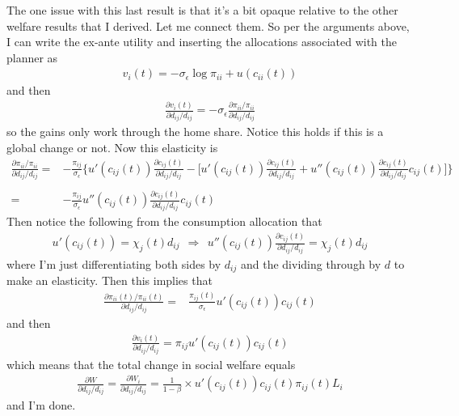 \documentclass[12pt,pdftex]{article}
\begin{document}
\begin{onehalfspacing}
The one issue with this last result is that it's a bit opaque relative to the other welfare results that I derived. Let me connect them. So per the arguments above, I can write the ex-ante utility  and inserting the allocations associated with the planner as
\begin{align}
v_i(t) = -\sigma_{\epsilon} \log \pi_{ii} + u(c_{ii}(t))
\end{align}
and then
\begin{align}
\frac{\partial v_i(t)}{\partial d_{ij} / d_{ij}} = -\sigma_{\epsilon} \frac{\partial \pi_{ii} / \pi_{ii}}{\partial d_{ij} / d_{ij}}
\end{align}
so the gains only work through the home share. Notice this holds if this is a global change or not. Now this elasticity is
\begin{align}
\frac{\partial \pi_{ii} / \pi_{ii}}{\partial d_{ij} / d_{ij}} =& -\frac{\pi_{ij}}{\sigma_{\epsilon}} \bigg \{ u'(c_{ij}(t))\frac{\partial c_{ij}(t)}{\partial d_{ij} / d_{ij}} - \bigg [u'(c_{ij}(t))\frac{\partial c_{ij}(t)}{\partial d_{ij} / d_{ij}} + u''(c_{ij}(t))\frac{\partial c_{ij}(t)}{\partial d_{ij} / d_{ij}}c_{ij}(t) \bigg ] \bigg \} \\
\nonumber \\
=& -\frac{\pi_{ij}}{\sigma_{\epsilon}}u''(c_{ij}(t))\frac{\partial c_{ij}(t)}{\partial d_{ij} / d_{ij}}c_{ij}(t)
\end{align}
Then notice the following from the consumption allocation that
\begin{align}
u'(c_{ij}(t) ) = \chi_{j}(t) d_{ij} \ \ \Rightarrow \ \ u''(c_{ij}(t))\frac{\partial c_{ij}(t)}{\partial d_{ij} / d_{ij}} = \chi_{j}(t)d_{ij}
\end{align}
where I'm just differentiating both sides by $d_{ij}$ and the dividing through by $d$ to make an elasticity. Then this implies that
\begin{align}
\frac{\partial \pi_{ii}(t) / \pi_{ii}(t)}{\partial d_{ij} / d_{ij}} =& \frac{\pi_{ij}(t)}{\sigma_{\epsilon}}u'(c_{ij}(t))c_{ij}(t)
\end{align}
and then
\begin{align}
\frac{\partial v_i(t)}{\partial d_{ij} / d_{ij}} = \pi_{ij}u'(c_{ij}(t))c_{ij}(t)
\end{align}
which means that the total change in social welfare equals
\begin{align}
\frac{\partial W}{\partial d_{ij} / d_{ij}} = \frac{\partial W_i}{\partial d_{ij} / d_{ij}} = \frac{1}{1-\beta} \times u'(c_{ij}(t)) c_{ij}(t) \pi_{ij}(t) L_i
\end{align}
and I'm done.



\end{onehalfspacing}
\end{document}
